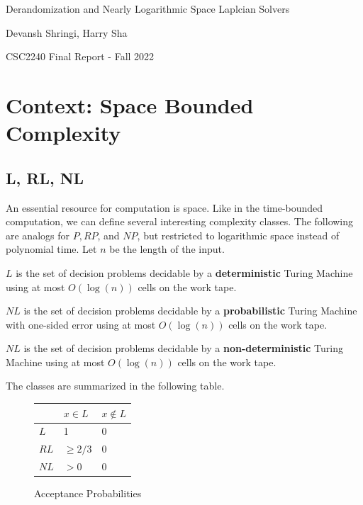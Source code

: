 \documentclass{article}
\begin{document}
\begin{center}
    \Large{Derandomization and Nearly Logarithmic Space Laplcian Solvers}

    \vspace{1em}

    \large{Devansh Shringi, Harry Sha}
    \vspace{1em}

    \large{CSC2240 Final Report - Fall 2022}
    \vspace{2em}
\end{center}  

\section{Context: Space Bounded Complexity}
\subsection{L, RL, NL}
An essential resource for computation is space. Like in the time-bounded computation, we can define several interesting complexity classes. The following are analogs for $P, RP$, and $NP$, but restricted to logarithmic space instead of polynomial time. Let $n$ be the length of the input.

\begin{definition}[L]
    $L$ is the set of decision problems decidable by a \textbf{deterministic} Turing Machine using at most $O(\log(n))$ cells on the work tape.
\end{definition}


\begin{definition}[RL]
    $NL$ is the set of decision problems decidable by a \textbf{probabilistic} Turing Machine with one-sided error using at most $O(\log(n))$ cells on the work tape.
\end{definition}

\begin{definition}[NL]
    $NL$ is the set of decision problems decidable by a \textbf{non-deterministic} Turing Machine using at most $O(\log(n))$ cells on the work tape.
\end{definition}

The classes are summarized in the following table.
\begin{figure}[ht]
    \begin{center}
    \begin{tabular}{l|l|l}
    & $x \in L$  & $x \notin L$ \\ \hline
    $L$   & 1          & 0            \\
    $RL$  & $\geq 2/3$ & 0            \\
    $NL$  & $> 0$      & 0           
    \end{tabular}
    \caption{Acceptance Probabilities}
    \end{center}
\end{figure}
\end{document}
